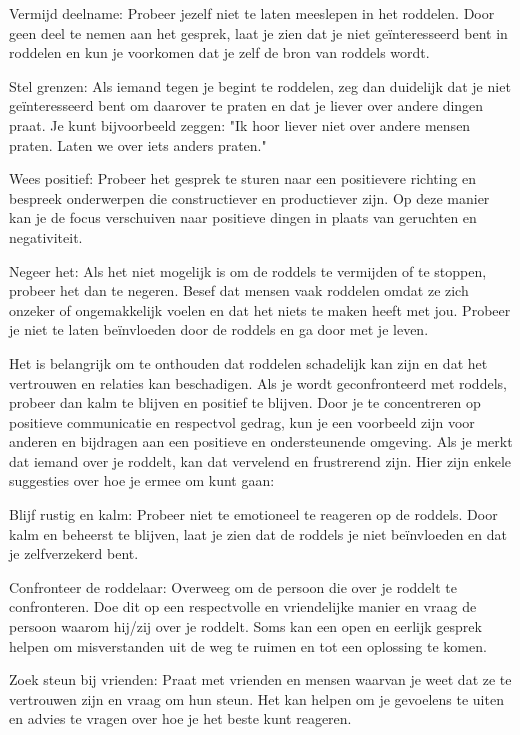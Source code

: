Vermijd deelname: Probeer jezelf niet te laten meeslepen in het roddelen. Door geen deel te nemen aan het gesprek, laat je zien dat je niet geïnteresseerd bent in roddelen en kun je voorkomen dat je zelf de bron van roddels wordt.

Stel grenzen: Als iemand tegen je begint te roddelen, zeg dan duidelijk dat je niet geïnteresseerd bent om daarover te praten en dat je liever over andere dingen praat. Je kunt bijvoorbeeld zeggen: "Ik hoor liever niet over andere mensen praten. Laten we over iets anders praten."

Wees positief: Probeer het gesprek te sturen naar een positievere richting en bespreek onderwerpen die constructiever en productiever zijn. Op deze manier kan je de focus verschuiven naar positieve dingen in plaats van geruchten en negativiteit.

Negeer het: Als het niet mogelijk is om de roddels te vermijden of te stoppen, probeer het dan te negeren. Besef dat mensen vaak roddelen omdat ze zich onzeker of ongemakkelijk voelen en dat het niets te maken heeft met jou. Probeer je niet te laten beïnvloeden door de roddels en ga door met je leven.

Het is belangrijk om te onthouden dat roddelen schadelijk kan zijn en dat het vertrouwen en relaties kan beschadigen. Als je wordt geconfronteerd met roddels, probeer dan kalm te blijven en positief te blijven. Door je te concentreren op positieve communicatie en respectvol gedrag, kun je een voorbeeld zijn voor anderen en bijdragen aan een positieve en ondersteunende omgeving.
Als je merkt dat iemand over je roddelt, kan dat vervelend en frustrerend zijn. Hier zijn enkele suggesties over hoe je ermee om kunt gaan:

Blijf rustig en kalm: Probeer niet te emotioneel te reageren op de roddels. Door kalm en beheerst te blijven, laat je zien dat de roddels je niet beïnvloeden en dat je zelfverzekerd bent.

Confronteer de roddelaar: Overweeg om de persoon die over je roddelt te confronteren. Doe dit op een respectvolle en vriendelijke manier en vraag de persoon waarom hij/zij over je roddelt. Soms kan een open en eerlijk gesprek helpen om misverstanden uit de weg te ruimen en tot een oplossing te komen.

Zoek steun bij vrienden: Praat met vrienden en mensen waarvan je weet dat ze te vertrouwen zijn en vraag om hun steun. Het kan helpen om je gevoelens te uiten en advies te vragen over hoe je het beste kunt reageren.

